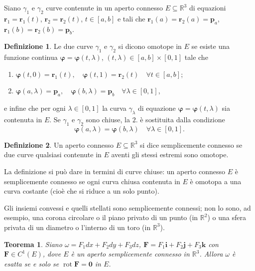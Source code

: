 \documentclass[a4paper]{book}
\DeclareMathOperator{\rot}{rot}
\numberwithin{equation}{section}
\renewcommand{\phi}{\varphi}
\theoremstyle{plain}
\newtheorem{teor}{Teorema}[section]
\theoremstyle{definition}
\newtheorem{defn}{Definizione}[section]
\theoremstyle{remark}
\renewcommand{\vec}{\boldsymbol}
\theoremstyle{example}
\begin{document}
Siano $\gamma_1$ e $\gamma_2$ curve contenute in un aperto connesso $E \subseteq \mathbb{R}^3$ di equazioni $\vec{r}_1 = \vec{r}_1(t)$, $\vec{r}_2 = \vec{r}_2(t)$, $t \in [a, b]$ e tali che $\vec{r}_1(a) = \vec{r}_2(a)=\vec{p}_a$, $\vec{r}_1(b) = \vec{r}_2(b) = \vec{p}_b$.

\begin{defn}
	Le due curve $\gamma_1$ e $\gamma_2$ si dicono omotope in $E$ se esiste una funzione continua $\vec{\phi} = \vec{\phi}(t, \lambda)$, $(t, \lambda) \in [a, b] \times [0, 1]$ tale che
	\begin{enumerate}
		\item $\vec{\phi}(t, 0) = \vec{r}_1(t), \quad \vec{\phi}(t, 1) = \vec{r}_2(t) \quad \forall t \in [a, b]$;
		\item $\vec{\phi}(a, \lambda) = \vec{p}_a, \quad \vec{\phi}(b, \lambda) = \vec{p}_b \quad \forall \lambda \in [0, 1] $,
	\end{enumerate}
	e infine che per ogni $\lambda \in [0, 1]$ la curva $\gamma_{\lambda}$ di equazione $\vec{\phi} = \vec{\phi}(t, \lambda)$ sia contenuta in $E$. Se $\gamma_1$ e $\gamma_2$ sono chiuse, la $2.$ è sostituita dalla condizione
	\begin{equation*}
		\vec{\phi}(a, \lambda) = \vec{\phi}(b, \lambda) \quad \forall \lambda \in [0, 1].
	\end{equation*}
\end{defn}

\begin{defn}
	Un aperto connesso $E \subseteq \mathbb{R}^3$ si dice semplicemente connesso se due curve qualsiasi contenute in $E$ aventi gli stessi estremi sono omotope.
\end{defn}

La definizione si può dare in termini di curve chiuse: un aperto connesso $E$ è semplicemente connesso se ogni curva chiusa contenuta in $E$ è omotopa a una curva costante (cioè che si riduce a un solo punto).

Gli insiemi convessi e quelli stellati sono semplicemente connessi; non lo sono, ad esempio, una corona circolare o il piano privato di un punto (in $\mathbb{R}^2$) o una sfera privata di un diametro o l'interno di un toro (in $\mathbb{R}^3$).

\begin{teor}
	Siano $\omega = F_1dx + F_2 dy + F_3 dz$, $\vec{F} = F_1\vec{i} + F_2\vec{j} + F_3\vec{k}$ con $\vec{F} \in C^1(E)$, dove $E$ è un aperto semplicemente connesso in $\mathbb{R}^3$. Allora $\omega$ è esatta se e solo se $\rot{\vec{F}} = \vec{0}$ in $E$.
\end{teor}
\end{document}
